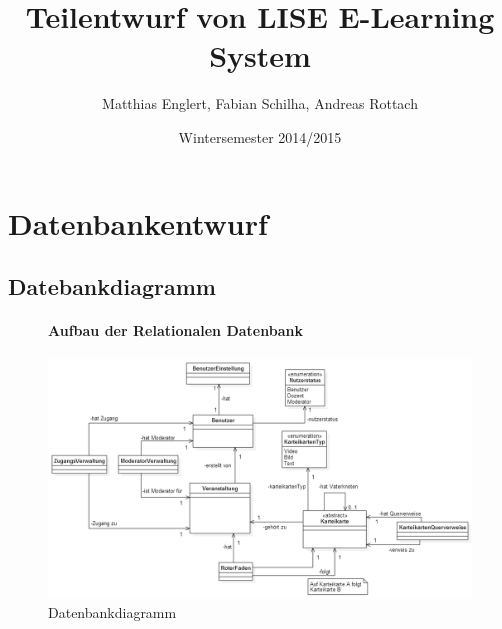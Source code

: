 \documentclass[12pt,a4paper]{article}
\title{Teilentwurf von  LISE E-Learning System}
\author{Matthias Englert, Fabian Schilha, Andreas Rottach}
\date{Wintersemester 2014/2015}
\begin{document}
\maketitle
\newpage
\tableofcontents
\newpage

\section{Datenbankentwurf}

\subsection{Datebankdiagramm}
\begin{figure}[H]
	\centering
	\paragraph{Aufbau der Relationalen Datenbank}	\includegraphics[width=\textwidth]{Bilder/Datenbank/Datenbankentwurf.png}
	\caption{Datenbankdiagramm}
	\label{Datenbankdiagramm}
\end{figure}
\end{document}
